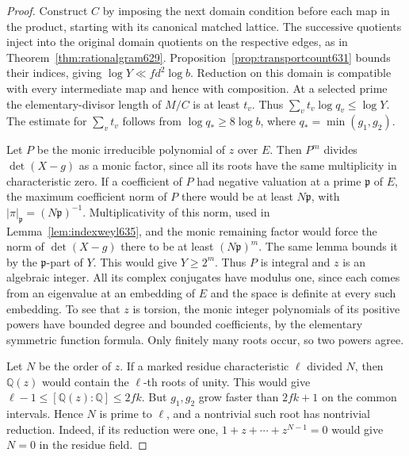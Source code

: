 \documentclass[a4paper,11pt]{article}
\theoremstyle{definition}
\theoremstyle{remark}
\numberwithin{equation}{section}
\begin{document}
\begin{proof}
Construct \(C\) by imposing the next domain condition before each
map in the product, starting with its canonical matched lattice.
The successive quotients inject into the original domain quotients
on the respective edges, as in Theorem~\ref{thm:rationalgram629}.
Proposition~\ref{prop:transportcount631} bounds their indices,
giving \(\log Y\ll f d^2\log b\). Reduction on this domain is
compatible with every intermediate map and hence with composition.
At a selected prime the elementary-divisor length of \(M/C\) is
at least \(t_v\). Thus \(\sum_v t_v\log q_v\le\log Y\).
The estimate for \(\sum_v t_v\) follows from \(\log q_*\ge8\log b\),
where \(q_*=\min(g_1,g_2)\).

Let \(P\) be the monic irreducible polynomial of \(z\) over \(E\).
Then \(P^m\) divides \(\det(X-g)\) as a monic factor, since all
its roots have the same multiplicity in characteristic zero.
If a coefficient of \(P\) had negative valuation at a prime
\(\mathfrak p\) of \(E\), the maximum coefficient norm of \(P\)
there would be at least \(N\mathfrak p\), with
\(|\pi|_{\mathfrak p}=(N\mathfrak p)^{-1}\). Multiplicativity
of this norm, used in Lemma~\ref{lem:indexweyl635}, and the monic
remaining factor would force the norm of \(\det(X-g)\) there
to be at least \((N\mathfrak p)^m\). The same lemma bounds it by
the \(\mathfrak p\)-part of \(Y\). This would give \(Y\ge2^m\).
Thus \(P\) is integral and \(z\) is an algebraic integer.
All its complex conjugates have modulus one, since each comes from
an eigenvalue at an embedding of \(E\) and the space is definite
at every such embedding. To see that \(z\) is torsion, the monic
integer polynomials of its positive powers have bounded degree and
bounded coefficients, by the elementary symmetric function formula.
Only finitely many roots occur, so two powers agree.

Let \(N\) be the order of \(z\). If a marked residue characteristic
\(\ell\) divided \(N\), then \(\mathbb Q(z)\) would contain the
\(\ell\)-th roots of unity. This would give
\(\ell-1\le[\mathbb Q(z):\mathbb Q]\le2fk\).
But \(g_1,g_2\) grow faster than \(2fk+1\) on the common intervals.
Hence \(N\) is prime to \(\ell\), and a nontrivial such root has
nontrivial reduction. Indeed, if its reduction were one,
\(1+z+\cdots+z^{N-1}=0\) would give \(N=0\) in the residue field.


\end{proof}
\end{document}
